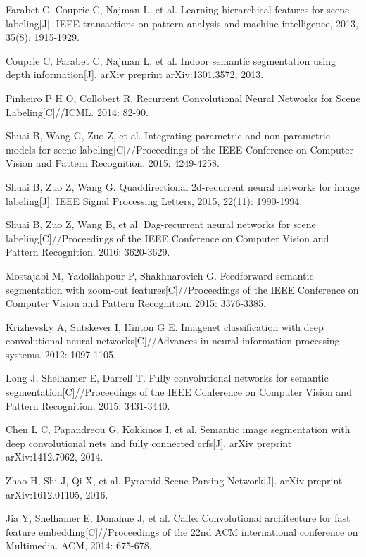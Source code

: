 \documentclass[10.5pt,compsoc]{TsT}
\theoremstyle{mystyle}
\begin{document}
{\begin{thebibliography}{99}
Farabet C, Couprie C, Najman L, et al. Learning hierarchical features for scene labeling[J]. IEEE transactions on pattern analysis and machine intelligence, 2013, 35(8): 1915-1929.

Couprie C, Farabet C, Najman L, et al. Indoor semantic segmentation using depth information[J]. arXiv preprint arXiv:1301.3572, 2013.

Pinheiro P H O, Collobert R. Recurrent Convolutional Neural Networks for Scene Labeling[C]//ICML. 2014: 82-90.

Shuai B, Wang G, Zuo Z, et al. Integrating parametric and non-parametric models for scene labeling[C]//Proceedings of the IEEE Conference on Computer Vision and Pattern Recognition. 2015: 4249-4258.

Shuai B, Zuo Z, Wang G. Quaddirectional 2d-recurrent neural networks for image labeling[J]. IEEE Signal Processing Letters, 2015, 22(11): 1990-1994.

Shuai B, Zuo Z, Wang B, et al. Dag-recurrent neural networks for scene labeling[C]//Proceedings of the IEEE Conference on Computer Vision and Pattern Recognition. 2016: 3620-3629.

Mostajabi M, Yadollahpour P, Shakhnarovich G. Feedforward semantic segmentation with zoom-out features[C]//Proceedings of the IEEE Conference on Computer Vision and Pattern Recognition. 2015: 3376-3385.

Krizhevsky A, Sutskever I, Hinton G E. Imagenet classification with deep convolutional neural networks[C]//Advances in neural information processing systems. 2012: 1097-1105.

Long J, Shelhamer E, Darrell T. Fully convolutional networks for semantic segmentation[C]//Proceedings of the IEEE Conference on Computer Vision and Pattern Recognition. 2015: 3431-3440.

Chen L C, Papandreou G, Kokkinos I, et al. Semantic image segmentation with deep convolutional nets and fully connected crfs[J]. arXiv preprint arXiv:1412.7062, 2014.

Zhao H, Shi J, Qi X, et al. Pyramid Scene Parsing Network[J]. arXiv preprint arXiv:1612.01105, 2016.

Jia Y, Shelhamer E, Donahue J, et al. Caffe: Convolutional architecture for fast feature embedding[C]//Proceedings of the 22nd ACM international conference on Multimedia. ACM, 2014: 675-678.


\end{thebibliography}}
\end{document}
